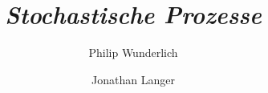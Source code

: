 \title{{\itshape Stochastische Prozesse}}
\author{Philip Wunderlich \and Jonathan Langer}

\pagestyle{netter_header}
